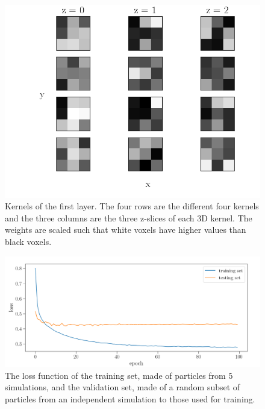 \documentclass[11pt]{article}
\begin{document}
\begin{figure}[t]
\centering
\includegraphics[width=0.85\columnwidth]{kernels_first_layer.png}
\caption{Kernels of the first layer. The four rows are the different four kernels and the three columns are the three z-slices of each 3D kernel. The weights are scaled such that white voxels have higher values than black voxels.}
\label{fig:kernels_first_layer}
\end{figure}

\begin{figure}[t]
\centering
\includegraphics[width=0.85\columnwidth]{loss.png}
\caption{The loss function of the training set, made of particles from $5$ simulations, and the validation set, made of a random subset of particles from an independent simulation to those used for training.}
\label{fig:loss}
\end{figure}
\end{document}
